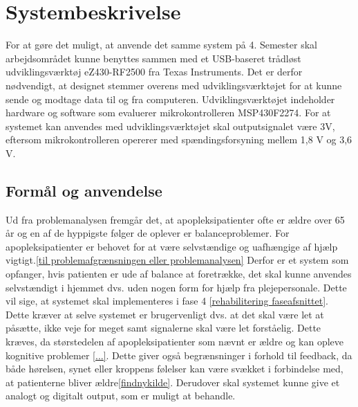 \section{Systembeskrivelse}
For at gøre det muligt, at anvende det samme system på 4. Semester skal arbejdsområdet kunne benyttes sammen med et USB-baseret trådløst udviklingsværktøj eZ430-RF2500 fra Texas Instruments. Det er derfor nødvendigt, at designet stemmer overens med udviklingsværktøjet for at kunne sende og modtage data til og fra computeren. Udviklingsværktøjet indeholder hardware og software som evaluerer mikrokontrolleren MSP430F2274. For at systemet kan anvendes med udviklingsværktøjet skal outputsignalet være 3V, eftersom mikrokontrolleren opererer med spændingsforsyning mellem 1,8 V og 3,6 V.  

\subsection{Formål og anvendelse}
Ud fra problemanalysen fremgår det, at apopleksipatienter ofte er ældre over 65 år og en af de hyppigste følger de oplever er balanceproblemer. For apopleksipatienter er behovet for at være selvstændige og uafhængige af hjælp vigtigt.\ref{til problemafgrænsningen eller problemanalysen}  
Derfor er et system som opfanger, hvis patienten er ude af balance at foretrække, det skal kunne anvendes selvstændigt i hjemmet dvs. uden nogen form for hjælp fra plejepersonale. Dette vil sige, at systemet skal implementeres i fase 4 \ref{rehabilitering faseafsnittet}. Dette kræver at selve systemet er brugervenligt dvs. at det skal være let at påsætte, ikke veje for meget samt signalerne skal være let forståelig. Dette kræves, da størstedelen af apopleksipatienter som nævnt er ældre og kan opleve kognitive problemer \ref{...}. Dette giver også begrænsninger i forhold til feedback, da både hørelsen, synet eller kroppens følelser kan være svækket i forbindelse med, at patienterne bliver ældre\ref{findnykilde}. Derudover skal systemet kunne give et analogt og digitalt output, som er muligt at behandle.


